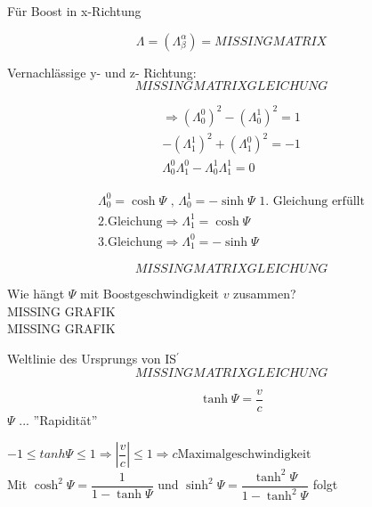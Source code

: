 \documentclass[a4paper, 11pt]{article}
\numberwithin{equation}{section}
\begin{document}
Für Boost in x-Richtung

\begin{equation}
\Lambda = \left(\Lambda^\alpha_\beta \right) = MISSING MATRIX
\end{equation}

Vernachlässige y- und z- Richtung:
\begin{equation*}
MISSING MATRIX GLEICHUNG
\end{equation*}

\begin{equation*}
\begin{aligned}
\Rightarrow \left(\Lambda^0_0 \right)^2 - \left(\Lambda^1_0 \right)^2 = 1\\
- \left(\Lambda^1_1 \right)^2 + \left(\Lambda^0_1 \right)^2  = -1 \\
\Lambda^0_0 \Lambda^0_1 - \Lambda^1_0 \Lambda^1_1 = 0
\end{aligned}
\end{equation*}

\begin{equation}
\begin{aligned}
\Lambda^0_0 = \cosh \Psi \text{  ,  } \Lambda^1_0 = - \sinh \Psi \text{  1. Gleichung erfüllt} \\
\text{2.Gleichung} \Rightarrow \Lambda ^1_1 = \cosh \Psi \\
\text{3.Gleichung} \Rightarrow \Lambda ^0_1 = -\sinh \Psi
\end{aligned}
\end{equation}

\begin{equation}
MISSING MATRIX GLEICHUNG
\end{equation}

Wie hängt $\Psi$ mit Boostgeschwindigkeit $v$ zusammen?\\
MISSING GRAFIK\\
MISSING GRAFIK

Weltlinie des Ursprungs von IS$^\prime$
\begin{equation*}
MISSING MATRIXGLEICHUNG
\end{equation*}

\begin{equation}
\boxed{
\tanh \Psi = \dfrac{v}{c}}
\end{equation}
$\Psi$ ... ''Rapidität''



$-1 \leq tanh \Psi \leq 1 \Rightarrow \left| \dfrac{v}{c} \right| \leq 1 \Rightarrow c \text{Maximalgeschwindigkeit}$\\
Mit $\cosh^2 \Psi = \dfrac{1}{1-\tanh \Psi}$ und $\sinh^2\Psi = \dfrac{\tanh^2\Psi}{1-\tanh^2 \Psi}$ folgt 
\end{document}
